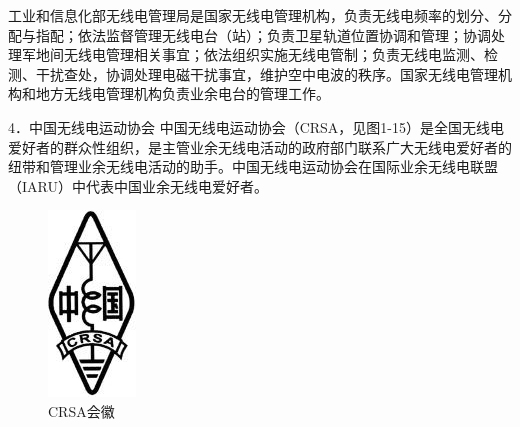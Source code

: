 \documentclass[12pt,UTF8]{ctexbook}
\begin{document}
工业和信息化部无线电管理局是国家无线电管理机构，负责无线电频率的划分、分配与指配；依法监督管理无线电台（站）；负责卫星轨道位置协调和管理；协调处理军地间无线电管理相关事宜；依法组织实施无线电管制；负责无线电监测、检测、干扰查处，协调处理电磁干扰事宜，维护空中电波的秩序。国家无线电管理机构和地方无线电管理机构负责业余电台的管理工作。

4．中国无线电运动协会
中国无线电运动协会（CRSA，见图1-15）是全国无线电爱好者的群众性组织，是主管业余无线电活动的政府部门联系广大无线电爱好者的纽带和管理业余无线电活动的助手。中国无线电运动协会在国际业余无线电联盟（IARU）中代表中国业余无线电爱好者。

\begin{figure}[htbp]
	\centering
	\includegraphics[width=0.7\linewidth]{15}
	\caption{CRSA会徽}
	\label{fig:1}
\end{figure}
\end{document}

